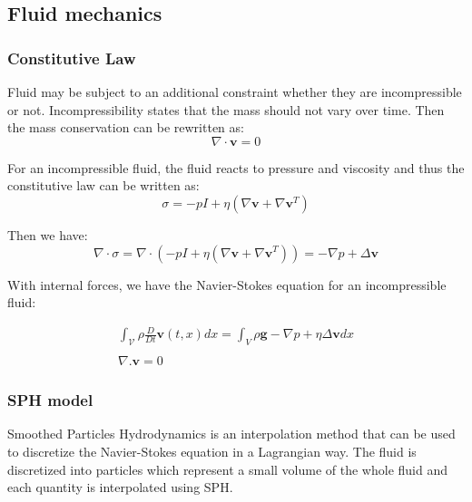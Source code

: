 \documentclass[11pt, oneside, a4paper]{memoir}
\begin{document}
\subsection{Fluid mechanics}

\subsubsection{Constitutive Law}

Fluid may be subject to an additional constraint whether they are incompressible or not. Incompressibility states that the mass should not vary over time. Then the mass conservation can be rewritten as:
\begin{equation}
\nabla \cdot \mathbf{v} = 0
\end{equation}

For an incompressible fluid, the fluid reacts to pressure and viscosity and thus the constitutive law can be written as:
\begin{equation}
\sigma = -pI + \eta \left( \nabla \mathbf{v} + \nabla \mathbf{v}^{T} \right)
\end{equation}

Then we have:
\begin{equation}
\nabla \cdot \sigma = \nabla \cdot \left( -pI + \eta \left( \nabla \mathbf{v} + \nabla \mathbf{v}^{T} \right) \right) = -\nabla p + \Delta \mathbf{v}
\end{equation}

With internal forces, we have the Navier-Stokes equation for an incompressible fluid:

\begin{equation}
\begin{array}{ll}
\displaystyle
\int_{\mathcal{V}} \rho \frac{D}{Dt} \mathbf{v}(t,x) dx = \int_{V} \rho \mathbf{g} -\nabla p + \eta \Delta \mathbf{v} dx \\ \\
\displaystyle
\nabla. \mathbf{v} = 0
\end{array}
\end{equation}

\subsubsection{SPH model}
Smoothed Particles Hydrodynamics is an interpolation method that can be used to discretize the Navier-Stokes equation in a Lagrangian way. The fluid is discretized into particles which represent a small volume of the whole fluid and each quantity is interpolated using SPH.
\end{document}

